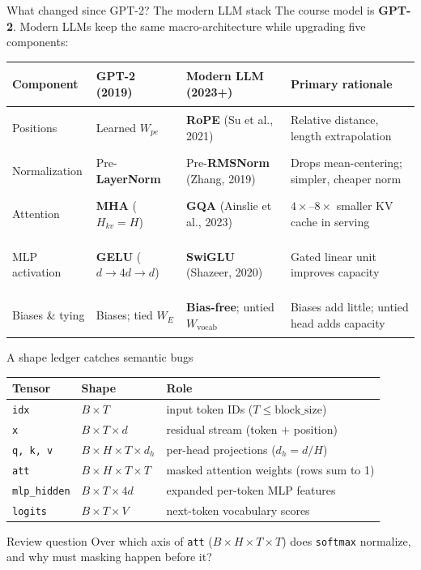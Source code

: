 \documentclass[handout]{beamer}
\begin{document}
\begin{frame}{What changed since GPT-2? The modern LLM stack}
  \small The course model is \textbf{GPT-2}. Modern LLMs keep the same macro-architecture while upgrading five components:
  \vspace{2pt}
  \centering\scriptsize
  \begin{tabular}{@{}>{\bfseries\raggedright\arraybackslash}p{1.85cm}>{\raggedright\arraybackslash}p{2.25cm}>{\raggedright\arraybackslash}p{2.85cm}>{\raggedright\arraybackslash}p{3.35cm}@{}}
    \toprule
    Component & GPT-2 (2019) & Modern LLM (2023+) & Primary rationale \\
    \midrule
    Positions & Learned $W_{pe}$ & \textbf{RoPE} (Su et al., 2021) & Relative distance, length extrapolation \\
    Normalization & Pre-\textbf{LayerNorm} & Pre-\textbf{RMSNorm} (Zhang, 2019) & Drops mean-centering; simpler, cheaper norm \\
    Attention & \textbf{MHA} ($H_{kv} = H$) & \textbf{GQA} (Ainslie et al., 2023) & $4\times$--$8\times$ smaller KV cache in serving \\
    MLP activation & \textbf{GELU} ($d \to 4d \to d$) & \textbf{SwiGLU} (Shazeer, 2020) & Gated linear unit improves capacity \\
    Biases \& tying & Biases; tied $W_E$ & \textbf{Bias-free}; untied $W_{\text{vocab}}$ & Biases add little; untied head adds capacity \\
    \bottomrule
  \end{tabular}
  \vfill
\end{frame}

\begin{frame}{A shape ledger catches semantic bugs}
  \centering\footnotesize
  \begin{tabular}{lll}
    \toprule
    Tensor & Shape & Role \\
    \midrule
    \texttt{idx} & $B\times T$ & input token IDs ($T \le \text{block\_size}$) \\
    \texttt{x} & $B\times T\times d$ & residual stream (token $+$ position) \\
    \texttt{q, k, v} & $B\times H\times T\times d_h$ & per-head projections ($d_h = d/H$) \\
    \texttt{att} & $B\times H\times T\times T$ & masked attention weights (rows sum to 1) \\
    \texttt{mlp\_hidden} & $B\times T\times 4d$ & expanded per-token MLP features \\
    \texttt{logits} & $B\times T\times V$ & next-token vocabulary scores \\
    \bottomrule
  \end{tabular}
  \vfill
  \begin{block}{Review question}
    Over which axis of \texttt{att} ($B \times H \times T \times T$) does \texttt{softmax} normalize, and why must masking happen before it?
  \end{block}
\end{frame}
\end{document}
